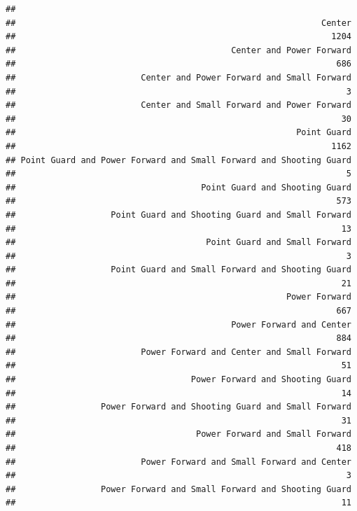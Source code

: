 \documentclass[
]{book}
\begin{document}
\begin{verbatim}
## 
##                                                             Center 
##                                                               1204 
##                                           Center and Power Forward 
##                                                                686 
##                         Center and Power Forward and Small Forward 
##                                                                  3 
##                         Center and Small Forward and Power Forward 
##                                                                 30 
##                                                        Point Guard 
##                                                               1162 
## Point Guard and Power Forward and Small Forward and Shooting Guard 
##                                                                  5 
##                                     Point Guard and Shooting Guard 
##                                                                573 
##                   Point Guard and Shooting Guard and Small Forward 
##                                                                 13 
##                                      Point Guard and Small Forward 
##                                                                  3 
##                   Point Guard and Small Forward and Shooting Guard 
##                                                                 21 
##                                                      Power Forward 
##                                                                667 
##                                           Power Forward and Center 
##                                                                884 
##                         Power Forward and Center and Small Forward 
##                                                                 51 
##                                   Power Forward and Shooting Guard 
##                                                                 14 
##                 Power Forward and Shooting Guard and Small Forward 
##                                                                 31 
##                                    Power Forward and Small Forward 
##                                                                418 
##                         Power Forward and Small Forward and Center 
##                                                                  3 
##                 Power Forward and Small Forward and Shooting Guard 
##                                                                 11 

\end{verbatim}
\end{document}
